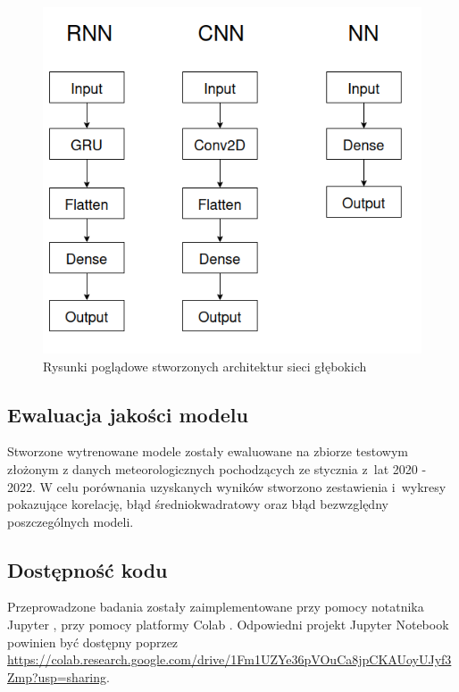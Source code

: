 \begin{figure}[H]
    \centering
    \includegraphics[width=\textwidth]{images/architectures.png}
    \caption[opis dla siatki]{Rysunki poglądowe stworzonych architektur sieci
    głębokich}
    \label{arch}
\end{figure}

\subsection{Ewaluacja jakości modelu}

Stworzone wytrenowane modele zostały ewaluowane na zbiorze testowym złożonym
z danych meteorologicznych pochodzących ze stycznia z~lat 2020 - 2022.
W celu porównania uzyskanych wyników stworzono zestawienia i~wykresy pokazujące
korelację, błąd średniokwadratowy oraz błąd bezwzględny poszczególnych modeli.

\subsection{Dostępność kodu}

Przeprowadzone badania zostały zaimplementowane przy pomocy notatnika Jupyter
\cite{jupyter}, przy pomocy platformy Colab \cite{colab}. Odpowiedni projekt
Jupyter Notebook powinien być dostępny poprzez \url{https://colab.research.google.com/drive/1Fm1UZYe36pVOuCa8jpCKAUoyUJyf3Zmp?usp=sharing}.